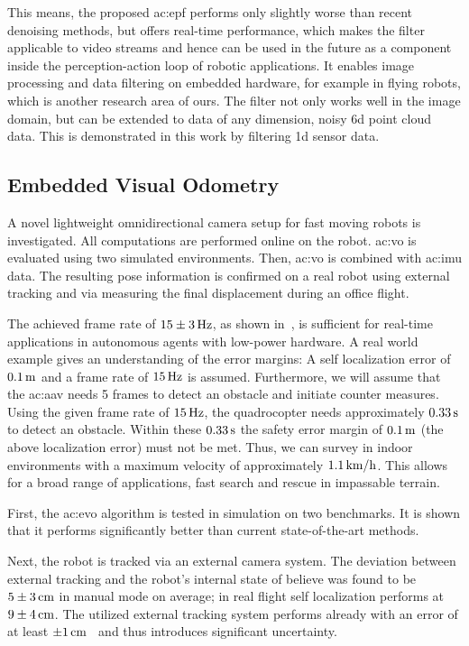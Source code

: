 This means, the proposed \gls{ac:epf} performs only slightly worse than recent denoising methods, but offers real-time performance, which makes the filter applicable to video streams and hence can be used in the future as a component inside the perception-action loop of robotic applications.
It enables image processing and data filtering on embedded hardware, for example in flying robots, which is another research area of ours.
The filter not only works well in the image domain, but can be extended to data of any dimension, \eg noisy 6d point cloud data.
This is demonstrated in this work by filtering 1d sensor data.





\subsection{Embedded Visual Odometry}

A novel lightweight omnidirectional camera setup for fast moving robots is investigated.
All computations are performed online on the robot.
\gls{ac:vo} is evaluated using two simulated environments.
Then, \gls{ac:vo} is combined with \gls{ac:imu} data.
The resulting pose information is confirmed on a real robot using external tracking and via measuring the final displacement during an office flight.

The achieved frame rate of $\unit[15 \pm 3]{Hz}$, as shown in~, is sufficient for real-time applications in autonomous agents with low-power hardware.
A real world example gives an understanding of the error margins: A self localization error of $\unit[0.1]{m}$ and a frame rate of $\unit[15]{Hz}$ is assumed.
Furthermore, we will assume that the \gls{ac:aav} needs 5 frames to detect an obstacle and initiate counter measures.
Using the given frame rate of $\unit[15]{Hz}$, the quadrocopter needs approximately $\unit[0.33]{s}$ to detect an obstacle.
Within these $\unit[0.33]{s}$ the safety error margin of $\unit[0.1]{m}$ (the above localization error) must not be met.
Thus, we can survey in indoor environments with a maximum velocity of approximately $\unit[1.1]{km/h}$.
This allows for a broad range of applications, \eg fast search and rescue in impassable terrain.

First, the \gls{ac:evo} algorithm is tested in simulation on two benchmarks.
It is shown that it performs significantly better than current state-of-the-art methods.

Next, the robot is tracked via an external camera system.
The deviation between external tracking and the robot's internal state of believe was found to be $\unit[5 \pm 3]{cm}$ in manual mode on average; in real flight self localization performs at $\unit[9 \pm 4]{cm}$.
The utilized external tracking system performs already with an error of at least $\unit[\pm 1]{cm}$~\cite{haggag2013measuring} and thus introduces significant uncertainty.

